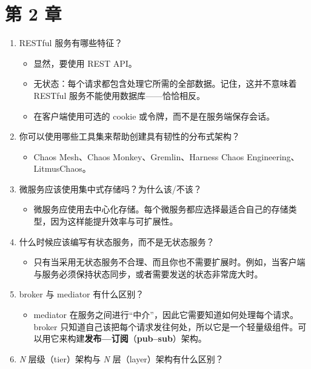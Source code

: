\section*{第 2 章}

\begin{enumerate}
\item RESTful 服务有哪些特征？

\begin{itemize}
\item 显然，要使用 REST API。
\item 无状态：每个请求都包含处理它所需的全部数据。记住，这并不意味着 RESTful 服务不能使用数据库——恰恰相反。
\item 在客户端使用可选的 cookie 或令牌，而不是在服务端保存会话。
\end{itemize}
\item 你可以使用哪些工具集来帮助创建具有韧性的分布式架构？

\begin{itemize}
\item Chaos Mesh、Chaos Monkey、Gremlin、Harness Chaos Engineering、LitmusChaos。
\end{itemize}
\item 微服务应该使用集中式存储吗？为什么该/不该？

\begin{itemize}
\item 微服务应使用去中心化存储。每个微服务都应选择最适合自己的存储类型，因为这样能提升效率与可扩展性。
\end{itemize}
\item 什么时候应该编写有状态服务，而不是无状态服务？

\begin{itemize}
\item 只有当采用无状态服务不合理、而且你也不需要扩展时。例如，当客户端与服务必须保持状态同步，或者需要发送的状态非常庞大时。
\end{itemize}
\item broker 与 mediator 有什么区别？

\begin{itemize}
\item mediator 在服务之间进行“中介”，因此它需要知道如何处理每个请求。broker 只知道自己该把每个请求发往何处，所以它是一个轻量级组件。可以用它来构建\textbf{发布—订阅}（\textbf{pub–sub}）架构。
\end{itemize}
\item \emph{N} 层级（tier）架构与 \emph{N} 层（layer）架构有什么区别？


\end{enumerate}
